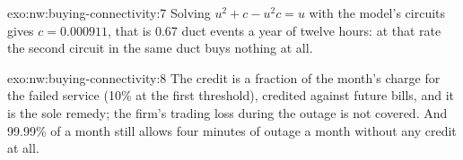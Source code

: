 \begin{solution}{exo:nw:buying-connectivity:7}
Solving $u^2 + c - u^2 c = u$ with the model's circuits gives $c = 0.000911$, that is 0.67 duct events a year of twelve hours: at that rate the second
circuit in the same duct buys nothing at all.
\end{solution}

\begin{solution}{exo:nw:buying-connectivity:8}
The credit is a fraction of the month's charge for the failed service (10\% at the first threshold), credited against future bills, and it is the
sole remedy; the firm's trading loss during the outage is not covered. And 99.99\% of a month still allows four minutes of outage a month without
any credit at all.
\end{solution}

